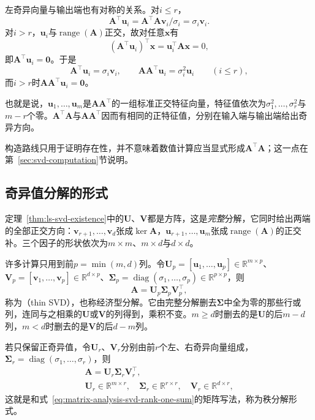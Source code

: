 左奇异向量与输出端也有对称的关系。对$i\leq r$，
\[
 \bm A^\top\bm u_i=\bm A^\top\bm A\bm v_i/\sigma_i=\sigma_i\bm v_i .
\]
对$i>r$，$\bm u_i$与$\operatorname{range}(\bm A)$正交，故对任意$\bm x$有
\[
 (\bm A^\top\bm u_i)^\top\bm x=\bm u_i^\top\bm A\bm x=0 ,
\]
即$\bm A^\top\bm u_i=\bm0$。于是
\begin{equation}
 \bm A^\top\bm u_i=\sigma_i\bm v_i,\qquad
 \bm A\bm A^\top\bm u_i=\sigma_i^2\bm u_i\qquad(i\leq r),
 \label{eq:ls-svd-transpose-relation}
\end{equation}
而$i>r$时$\bm A\bm A^\top\bm u_i=\bm0$。

也就是说，$\bm u_1,\ldots,\bm u_m$是$\bm A\bm A^\top$的一组标准正交特征向量，特征值依次为$\sigma_1^2,\ldots,\sigma_r^2$与$m-r$个零。$\bm A^\top\bm A$与$\bm A\bm A^\top$因而有相同的正特征值，分别在输入端与输出端给出奇异方向。

构造路线只用于证明存在性，并不意味着数值计算应当显式形成$\bm A^\top\bm A$；这一点在第~\ref{sec:svd-computation}节说明。

\subsection{奇异值分解的形式}
\label{sec:svd-forms}

定理~\ref{thm:ls-svd-existence}中的$\bm U$、$\bm V$都是方阵，这是\emph{完整}分解，它同时给出两端的全部正交方向：$\bm v_{r+1},\ldots,\bm v_d$张成$\ker\bm A$，$\bm u_{r+1},\ldots,\bm u_m$张成$\operatorname{range}(\bm A)$的正交补。三个因子的形状依次为$m\times m$、$m\times d$与$d\times d$。

许多计算只用到前$p=\min(m,d)$列。令$\bm U_p=[\bm u_1,\ldots,\bm u_p]\in\mathbb R^{m\times p}$、$\bm V_p=[\bm v_1,\ldots,\bm v_p]\in\mathbb R^{d\times p}$、$\bm\Sigma_p=\operatorname{diag}(\sigma_1,\ldots,\sigma_p)\in\mathbb R^{p\times p}$，则
\[
 \bm A=\bm U_p\bm\Sigma_p\bm V_p^\top ,
\]
称为（thin SVD），也称经济型分解。它由完整分解删去$\bm\Sigma$中全为零的那些行或列，连同与之相乘的$\bm U$或$\bm V$的列得到，乘积不变。$m\geq d$时删去的是$\bm U$的后$m-d$列，$m<d$时删去的是$\bm V$的后$d-m$列。

若只保留正奇异值，令$\bm U_r$、$\bm V_r$分别由前$r$个左、右奇异向量组成，$\bm\Sigma_r=\operatorname{diag}(\sigma_1,\ldots,\sigma_r)$，则
\[
 \begin{gathered}
 \bm A=\bm U_r\bm\Sigma_r\bm V_r^\top,\\
 \bm U_r\in\mathbb R^{m\times r},\quad\bm\Sigma_r\in\mathbb R^{r\times r},\quad\bm V_r\in\mathbb R^{d\times r},
 \end{gathered}
\]
这就是和式~\eqref{eq:matrix-analysis-svd-rank-one-sum}的矩阵写法，称为秩分解形式。

